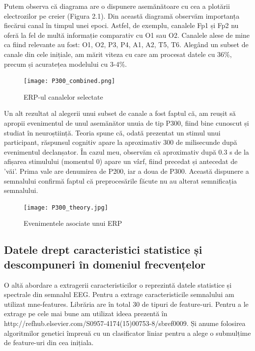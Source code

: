 Putem observa că diagrama are o dispunere asemănătoare cu cea a plotării electrozilor pe creier (Figura 2.1). Din această diagramă observăm importanța fiecărui canal în timpul unei epoci. Astfel, de exemplu, canalele Fp1 și Fp2 nu oferă la fel de multă informație comparativ cu O1 sau O2. Canalele alese de mine ca fiind relevante au fost: O1, O2, P3, P4, A1, A2, T5, T6. Alegând un subset de canale din cele inițiale, am mărit viteza cu care am procesat datele cu 36\%, precum și acuratețea modelului cu 3-4\%.

\vspace{1em}
\begin{figure}[!h]
    \centering
    \texttt{[image: P300\_combined.png]}
    \caption{ERP-ul canalelor selectate}
    \label{fig:enter-label}
\end{figure}

Un alt rezultat al alegerii unui subset de canale a fost faptul că, am reușit să apropii evenimentul de unul asemănător unuia de tip P300\cite{P300}, fiind bine cunoscut și studiat în neuroștiință. Teoria spune că, odată prezentat un stimul unui participant, răspunsul cognitiv apare la aproximativ 300 de milisecunde după evenimentul declanșator. În cazul meu, observăm că aproximativ după 0.3 s de la afișarea stimulului (momentul 0) apare un vârf, fiind precedat și antecedat de 'văi'. Prima vale are denumirea de P200, iar a doua de P300. Această dispunere a semnalului confirmă faptul că preprocesările făcute nu au alterat semnificația semnalului. %

\vspace{1em}
\begin{figure}[h]
    \centering
    \texttt{[image: P300\_theory.jpg]}
    \caption{Evenimentele asociate unui ERP\cite{P300_image}}
    \label{fig:enter-label}
\end{figure}


\subsection{Datele drept caracteristici statistice și descompuneri în domeniul frecvențelor}

O altă abordare a extragerii caracteristicilor o reprezintă datele statistice și spectrale din semnalul EEG. Pentru a extrage caracteristicile semnalului am utilizat mne-features\cite{mne-features}. Librăria are în total 30 de tipuri de feature-uri. Pentru a le extrage pe cele mai bune am utilizat ideea prezentă în http://refhub.elsevier.com/S0957-4174(15)00753-8/sbref0009. Și anume folosirea algoritmilor genetici împreuă cu un clasificator liniar pentru a alege o submulțime de feature-uri din cea inițiala.

